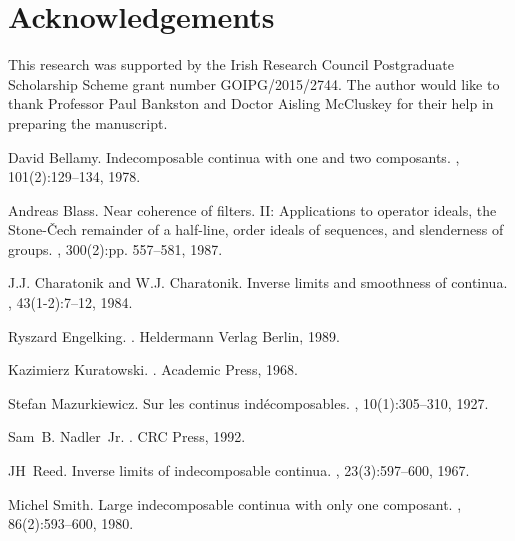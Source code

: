 \documentclass[12pt]{article}
\theoremstyle{plain}
\theoremstyle{definition}
\newcommand{\0}{\ensuremath{\varnothing}}
\begin{document}
	
	\section*{Acknowledgements}
	This research was supported by the Irish Research Council Postgraduate Scholarship Scheme grant number GOIPG/2015/2744. 
	The author would like to thank Professor Paul Bankston and Doctor Aisling McCluskey for their help in preparing the manuscript. 
	

	 \begin{thebibliography}{1}
	 	
	 	David Bellamy.
	 	\newblock Indecomposable continua with one and two composants.
	 	, 101(2):129--134, 1978.
	 	
	 	Andreas Blass.
	 	\newblock Near coherence of filters. {II}: Applications to operator ideals, the
	 	{S}tone-\v{C}ech remainder of a half-line, order ideals of sequences, and
	 	slenderness of groups.
	 	, 300(2):pp.
	 	557--581, 1987.
	 	
	 	J.J. Charatonik and W.J. Charatonik.
	 	\newblock Inverse limits and smoothness of continua.
	 	, 43(1-2):7--12, 1984.
	 	
	 	Ryszard Engelking.
	 	.
	 	\newblock Heldermann Verlag Berlin, 1989.
	 	
	 	Kazimierz Kuratowski.
	 	.
	 	\newblock Academic Press, 1968.
	 	
	 	Stefan Mazurkiewicz.
	 	\newblock Sur les continus ind\'ecomposables.
	 	, 10(1):305--310, 1927.
	 	
	 	Sam~B. Nadler~Jr.
	 	.
	 	\newblock CRC Press, 1992.
	 	
	 	JH~Reed.
	 	\newblock Inverse limits of indecomposable continua.
	 	, 23(3):597--600, 1967.
	 	
	 	Michel Smith.
	 	\newblock Large indecomposable continua with only one composant.
	 	, 86(2):593--600, 1980.
	 	
	 \end{thebibliography}
\end{document}
